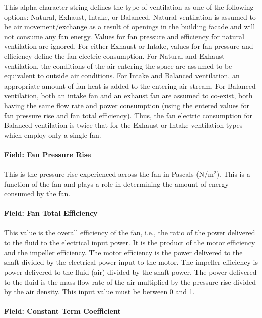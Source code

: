 This alpha character string defines the type of ventilation as one of the following options: Natural, Exhaust, Intake, or Balanced. Natural ventilation is assumed to be air movement/exchange as a result of openings in the building facade and will not consume any fan energy. Values for fan pressure and efficiency for natural ventilation are ignored. For either Exhaust or Intake, values for fan pressure and efficiency define the fan electric consumption. For Natural and Exhaust ventilation, the conditions of the air entering the space are assumed to be equivalent to outside air conditions. For Intake and Balanced ventilation, an appropriate amount of fan heat is added to the entering air stream. For Balanced ventilation, both an intake fan and an exhaust fan are assumed to co-exist, both having the same flow rate and power consumption (using the entered values for fan pressure rise and fan total efficiency). Thus, the fan electric consumption for Balanced ventilation is twice that for the Exhaust or Intake ventilation types which employ only a single fan.

\paragraph{Field: Fan Pressure Rise}\label{field-fan-pressure-rise}

This is the pressure rise experienced across the fan in Pascals (N/m\(^{2}\)). This is a function of the fan and plays a role in determining the amount of energy consumed by the fan.

\paragraph{Field: Fan Total Efficiency}\label{field-fan-total-efficiency}

This value is the overall efficiency of the fan, i.e., the ratio of the power delivered to the fluid to the electrical input power. It is the product of the motor efficiency and the impeller efficiency. The motor efficiency is the power delivered to the shaft divided by the electrical power input to the motor. The impeller efficiency is power delivered to the fluid (air) divided by the shaft power. The power delivered to the fluid is the mass flow rate of the air multiplied by the pressure rise divided by the air density. This input value must be between 0 and 1.

\paragraph{Field: Constant Term Coefficient}\label{field-constant-term-coefficient-1}

